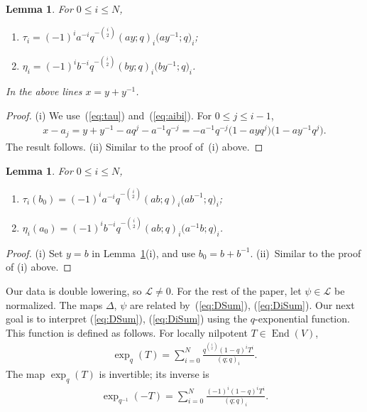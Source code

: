 \documentclass[pdftex]{sigma}
\numberwithin{equation}{section}
\newtheorem{Lemma}[Theorem]{Lemma}
\begin{document}
\begin{Lemma}\label{lem:qte}For $0 \leq i \leq N$,
\begin{enumerate}\itemsep=0pt
\item[$(i)$] $\tau_i = (-1)^i a^{-i} q^{-\binom{i}{2}}(ay;q)_i \big(ay^{-1};q\big)_i$;
\item[$(ii)$] $\eta_i = (-1)^i b^{-i} q^{-\binom{i}{2}} (by;q)_i \big(by^{-1};q\big)_i$.
\end{enumerate}
In the above lines $x = y+ y^{-1}$.
\end{Lemma}
\begin{proof}(i) We use~(\ref{eq:tau}) and~(\ref{eq:aibi}).
For $0 \leq j \leq i-1$,
\begin{gather*}
x - a_{j} = y+y^{-1} - a q^{j} - a^{-1} q^{-j}= -a^{-1} q^{-j} \big(1-ayq^{j}\big)\big(1-ay^{-1} q^{j}\big).
\end{gather*}
The result follows. (ii) Similar to the proof of~(i) above.
\end{proof}

\begin{Lemma}\label{lem:tauai}
For $0 \leq i \leq N$,
\begin{enumerate}\itemsep=0pt
\item[$(i)$] $\tau_i(b_0) = (-1)^i a^{-i} q^{-\binom{i}{2}}
(ab;q)_i \big(ab^{-1};q\big)_i$;
\item[$(ii)$] $\eta_i(a_0) = (-1)^i b^{-i} q^{-\binom{i}{2}}
(ab;q)_i \big(a^{-1}b;q\big)_i$.
\end{enumerate}
\end{Lemma}
\begin{proof} (i) Set $y=b$ in
Lemma~\ref{lem:qte}(i), and use $b_0=b+b^{-1}$.
(ii)~Similar to the proof of (i) above.
\end{proof}

Our data is double lowering, so $\mathcal L\not=0$.
For the rest of the paper, let $ \psi \in \mathcal L$ be normalized.
The maps $\Delta$, $\psi$ are related
by~(\ref{eq:DSum}),
(\ref{eq:DiSum}). Our next goal is to interpret
(\ref{eq:DSum}),
(\ref{eq:DiSum}) using the
 $q$-exponential function.
This function is defined as follows.
For locally nilpotent $T \in \operatorname{End}(V)$,
\begin{gather}
\exp_q(T) = \sum_{i=0}^N \frac{q^{\binom{i}{2}}(1-q)^i T^i}{ (q;q)_i}.\label{eq:qExp}
\end{gather}
The map
$\exp_q(T)$ is invertible; its inverse is
\begin{gather}\label{eq:qExpi}
\exp_{q^{-1}}(-T) = \sum_{i=0}^N\frac{(-1)^i (1-q)^i T^i}{ (q;q)_i}.
\end{gather}
\end{document}
